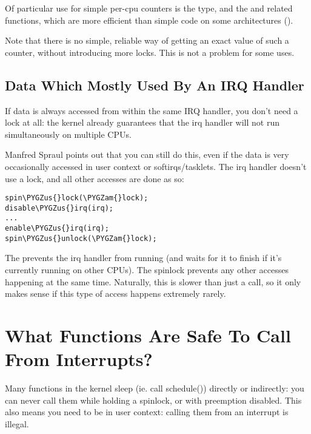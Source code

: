 \documentclass[a4paper,8pt,english]{sphinxmanual}
\def\PYGZus{\char`\_}
\def\PYGZam{\char`\&}
\begin{document}
Of particular use for simple per-cpu counters is the  type,
and the  and related functions, which are
more efficient than simple code on some architectures
().

Note that there is no simple, reliable way of getting an exact value of
such a counter, without introducing more locks. This is not a problem
for some uses.


\subsection{Data Which Mostly Used By An IRQ Handler}
\label{kernel-hacking/locking:data-which-mostly-used-by-an-irq-handler}
If data is always accessed from within the same IRQ handler, you don't
need a lock at all: the kernel already guarantees that the irq handler
will not run simultaneously on multiple CPUs.

Manfred Spraul points out that you can still do this, even if the data
is very occasionally accessed in user context or softirqs/tasklets. The
irq handler doesn't use a lock, and all other accesses are done as so:

\begin{Verbatim}[commandchars=\\\{\}]
spin\PYGZus{}lock(\PYGZam{}lock);
disable\PYGZus{}irq(irq);
...
enable\PYGZus{}irq(irq);
spin\PYGZus{}unlock(\PYGZam{}lock);
\end{Verbatim}

The  prevents the irq handler from running
(and waits for it to finish if it's currently running on other CPUs).
The spinlock prevents any other accesses happening at the same time.
Naturally, this is slower than just a 
call, so it only makes sense if this type of access happens extremely
rarely.


\section{What Functions Are Safe To Call From Interrupts?}
\label{kernel-hacking/locking:what-functions-are-safe-to-call-from-interrupts}
Many functions in the kernel sleep (ie. call schedule()) directly or
indirectly: you can never call them while holding a spinlock, or with
preemption disabled. This also means you need to be in user context:
calling them from an interrupt is illegal.
\end{document}
